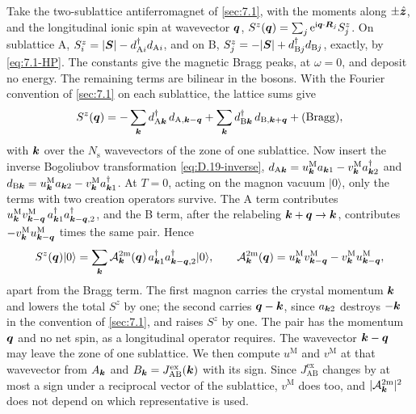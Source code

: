 Take the two-sublattice antiferromagnet of \cref{sec:7.1}, with the moments along $\pm\hat{\bm{z}}$, and the longitudinal ionic spin at wavevector $\bm{q}$, $S^z(\bm{q}) = \sum_j\mathrm{e}^{\mathrm{i}\bm{q}\cdot\bm{R}_j}S^z_j$. On sublattice A, $S^z_i = |\bm{S}| - d^\dagger_{\mathrm{A}i}d_{\mathrm{A}i}$, and on B, $S^z_j = -|\bm{S}| + d^\dagger_{\mathrm{B}j}d_{\mathrm{B}j}$, exactly, by \cref{eq:7.1-HP}. The constants give the magnetic Bragg peaks, at $\omega = 0$, and deposit no energy. The remaining terms are bilinear in the bosons. With the Fourier convention of \cref{sec:7.1} on each sublattice, the lattice sums give
\begin{equation*}
  S^z(\bm{q}) = -\sum_{\bm{k}}d^\dagger_{\mathrm{A}\bm{k}}\,d_{\mathrm{A},\bm{k}-\bm{q}} + \sum_{\bm{k}}d^\dagger_{\mathrm{B}\bm{k}}\,d_{\mathrm{B},\bm{k}+\bm{q}} + (\text{Bragg}) ,
\end{equation*}
with $\bm{k}$ over the $N_{\mathrm{s}}$ wavevectors of the zone of one sublattice. Now insert the inverse Bogoliubov transformation \cref{eq:D.19-inverse}, $d_{\mathrm{A}\bm{k}} = u^{\mathrm{M}}_{\bm{k}}a_{\bm{k}1} - v^{\mathrm{M}}_{\bm{k}}a^\dagger_{\bm{k}2}$ and $d_{\mathrm{B}\bm{k}} = u^{\mathrm{M}}_{\bm{k}}a_{\bm{k}2} - v^{\mathrm{M}}_{\bm{k}}a^\dagger_{\bm{k}1}$. At $T = 0$, acting on the magnon vacuum $|0\rangle$, only the terms with two creation operators survive. The A term contributes $u^{\mathrm{M}}_{\bm{k}}v^{\mathrm{M}}_{\bm{k}-\bm{q}}\,a^\dagger_{\bm{k}1}a^\dagger_{\bm{k}-\bm{q},2}$, and the B term, after the relabeling $\bm{k} + \bm{q} \to \bm{k}$, contributes $-v^{\mathrm{M}}_{\bm{k}}u^{\mathrm{M}}_{\bm{k}-\bm{q}}$ times the same pair. Hence
\begin{equation}
  S^z(\bm{q})|0\rangle = \sum_{\bm{k}}\mathcal{A}^{\mathrm{2m}}_{\bm{k}}(\bm{q})\,a^\dagger_{\bm{k}1}a^\dagger_{\bm{k}-\bm{q},2}|0\rangle , \qquad
  \mathcal{A}^{\mathrm{2m}}_{\bm{k}}(\bm{q}) = u^{\mathrm{M}}_{\bm{k}}v^{\mathrm{M}}_{\bm{k}-\bm{q}} - v^{\mathrm{M}}_{\bm{k}}u^{\mathrm{M}}_{\bm{k}-\bm{q}} ,
  \label{eq:14.2-amp}
\end{equation}
apart from the Bragg term. The first magnon carries the crystal momentum $\bm{k}$ and lowers the total $S^z$ by one; the second carries $\bm{q} - \bm{k}$, since $a_{\bm{k}2}$ destroys $-\bm{k}$ in the convention of \cref{sec:7.1}, and raises $S^z$ by one. The pair has the momentum $\bm{q}$ and no net spin, as a longitudinal operator requires. The wavevector $\bm{k} - \bm{q}$ may leave the zone of one sublattice. We then compute $u^{\mathrm{M}}$ and $v^{\mathrm{M}}$ at that wavevector from $A_{\bm{k}}$ and $B_{\bm{k}} = J^{\mathrm{ex}}_{\mathrm{AB}}(\bm{k})$ with its sign. Since $J^{\mathrm{ex}}_{\mathrm{AB}}$ changes by at most a sign under a reciprocal vector of the sublattice, $v^{\mathrm{M}}$ does too, and $|\mathcal{A}^{\mathrm{2m}}_{\bm{k}}|^2$ does not depend on which representative is used.

